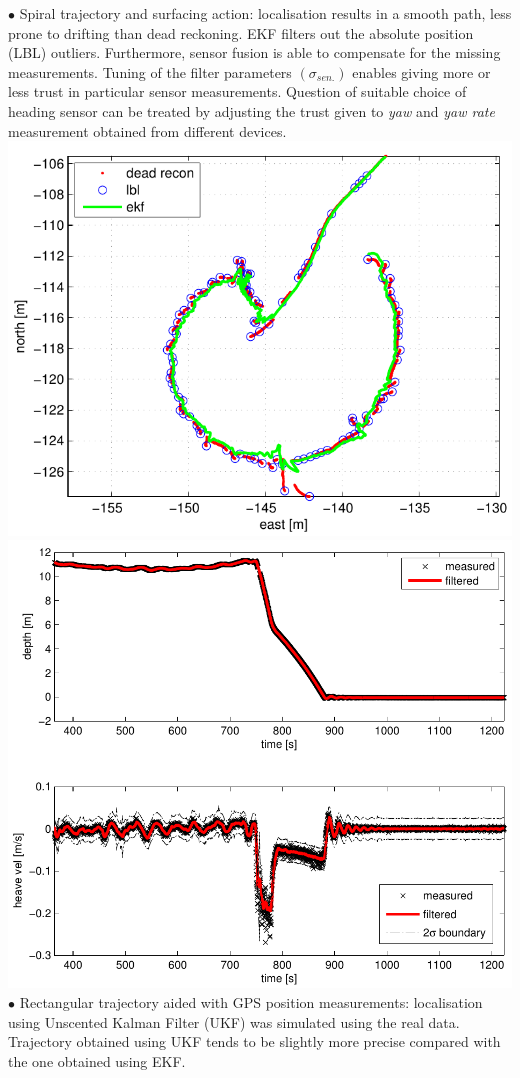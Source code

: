 \documentclass[portrait,final,a0paper]{baposter}
\begin{document}
\begin{poster}
{$\bullet$ Spiral trajectory and surfacing action: localisation results in a smooth path, less prone to drifting than dead reckoning. EKF filters out the absolute position (LBL) outliers. Furthermore, sensor fusion is able to compensate for the missing measurements. Tuning of the filter parameters $(\sigma_{sen.})$ enables giving more or less trust in particular sensor measurements. Question of suitable choice of heading sensor can be treated by adjusting the trust given to \textit{yaw} and \textit{yaw rate} measurement obtained from different devices. 
\\
    {\includegraphics[width=0.5\linewidth]{spiral2d.pdf}}
	\includegraphics[width=0.43\linewidth]{spiral-depth.pdf}
\\	  
$\bullet$ Rectangular trajectory aided with GPS position measurements: localisation using Unscented Kalman Filter (UKF) was simulated using the real data. Trajectory obtained using UKF tends to be slightly more precise compared with the one obtained using EKF. 
\\	
\begin{tabular}{cl}

\end{tabular}}
\end{poster}
\end{document}
